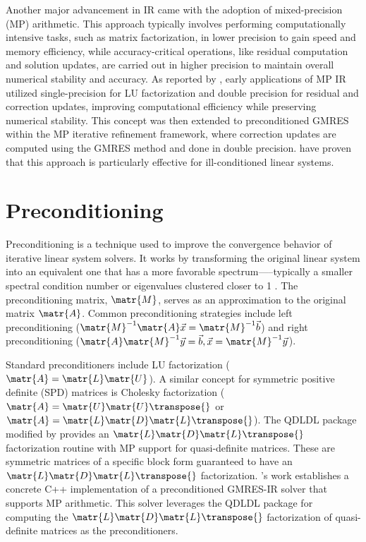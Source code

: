 Another major advancement in IR came with the adoption of mixed-precision (MP)
arithmetic. This approach typically involves performing computationally
intensive tasks, such as matrix factorization, in lower precision to gain speed
and memory efficiency, while accuracy-critical operations, like residual
computation and solution updates, are carried out in higher precision to
maintain overall numerical stability and accuracy. As reported by
\textcite{wong_exploring_2024}, early applications of MP IR utilized
single-precision for LU factorization and double precision for residual and
correction updates, improving computational efficiency while preserving
numerical stability. This concept was then extended to preconditioned GMRES
within the MP iterative refinement framework, where correction updates are
computed using the GMRES method and done in double precision.
\textcite{lindquist_improving_2020} have proven that this approach is
particularly effective for ill-conditioned linear systems.

\section{Preconditioning}
\label{sec:preconditioning}

Preconditioning is a technique used to improve the convergence behavior of
iterative linear system solvers. It works by transforming the original linear
system into an equivalent one that has a more favorable spectrum—--typically a
smaller spectral condition number or eigenvalues clustered closer to 1
\cite[p.~187]{ascher_first_2011}. The preconditioning matrix, \(\matr{M}\),
serves as an approximation to the original matrix \(\matr{A}\). Common
preconditioning strategies include left preconditioning (\(\matr{M}^{-1}
\matr{A} \vec{x} = \matr{M}^{-1} \vec{b}\)) and right preconditioning (\(\matr{A}
\matr{M}^{-1} \vec{y} = \vec{b}, \vec{x} = \matr{M}^{-1} \vec{y}\)).

Standard preconditioners include LU factorization (\(\matr{A} = \matr{L}
\matr{U}\)). A similar concept for symmetric positive definite (SPD) matrices is
Cholesky factorization (\(\matr{A} = \matr{U} \matr{U}\transpose{}\) or
\(\matr{A} = \matr{L} \matr{D} \matr{L}\transpose{}\)). The QDLDL package
modified by \textcite{shahrooz_derakhshan_using_2023} provides an \(\matr{L}
\matr{D} \matr{L}\transpose{}\) factorization routine with MP support for
quasi-definite matrices. These are symmetric matrices of a specific block form
guaranteed to have an \(\matr{L} \matr{D} \matr{L}\transpose{}\) factorization.
\textcite{wong_exploring_2024}'s work establishes a concrete C++ implementation
of a preconditioned GMRES-IR solver that supports MP arithmetic. This solver
leverages the QDLDL package for computing the \(\matr{L} \matr{D}
\matr{L}\transpose{}\) factorization of quasi-definite matrices as the
preconditioners.

